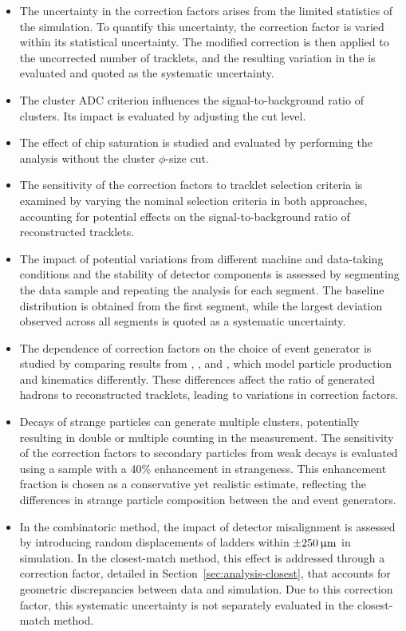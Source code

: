 \begin{itemize}
    \item The uncertainty in the correction factors arises from the limited statistics of the simulation. To quantify this uncertainty, the correction factor is varied within its statistical uncertainty. The modified correction is then applied to the uncorrected number of tracklets, and the resulting variation in the \dndeta is evaluated and quoted as the systematic uncertainty. 
    \item The cluster ADC criterion influences the signal-to-background ratio of clusters. Its impact is evaluated by adjusting the cut level.
    \item The effect of \intt chip saturation is studied and evaluated by performing the analysis without the cluster $\phi$-size cut. 
    \item The sensitivity of the correction factors to tracklet selection criteria is examined by varying the nominal selection criteria in both approaches, accounting for potential effects on the signal-to-background ratio of reconstructed tracklets. 
    \item The impact of potential variations from different machine and data-taking conditions and the stability of detector components is assessed by segmenting the data sample and repeating the analysis for each segment. The baseline \dndeta distribution is obtained from the first segment, while the largest deviation observed across all segments is quoted as a systematic uncertainty.
    \item The dependence of correction factors on the choice of event generator is studied by comparing results from \hijing, \epos, and \ampt, which model particle production and kinematics differently. These differences affect the ratio of generated hadrons to reconstructed tracklets, leading to variations in correction factors.
    \item Decays of strange particles can generate multiple clusters, potentially resulting in double or multiple counting in the \dndeta measurement. The sensitivity of the correction factors to secondary particles from weak decays is evaluated using a \hijing sample with a 40\% enhancement in strangeness. This enhancement fraction is chosen as a conservative yet realistic estimate, reflecting the differences in strange particle composition between the \hijing and \epos event generators.
    \item In the combinatoric method, the impact of detector misalignment is assessed by introducing random displacements of \intt ladders within $\pm250\,\upmu\mathrm{m}$ in simulation. In the closest-match method, this effect is addressed through a correction factor, detailed in Section~\ref{sec:analysis-closest}, that accounts for geometric discrepancies between data and simulation. Due to this correction factor, this systematic uncertainty is not separately evaluated in the closest-match method.

\end{itemize}
